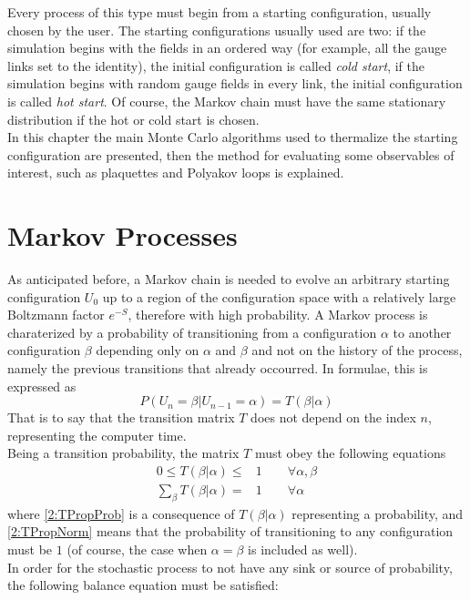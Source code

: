 Every process of this type must begin from a starting configuration, usually chosen by the user.
The starting configurations usually used are two: if the simulation begins with the fields in an ordered way (for example, all the gauge links set to the identity), the initial configuration is called \emph{cold start}, if the simulation begins with random gauge fields in every link, the initial configuration is called \emph{hot start}.
Of course, the Markov chain must have the same stationary distribution if the hot or cold start is chosen.\\
In this chapter the main Monte Carlo algorithms used to thermalize the starting configuration are presented, then the method for evaluating some observables of interest, such as plaquettes and Polyakov loops is explained.

\section{Markov Processes}
As anticipated before, a Markov chain is needed to evolve an arbitrary starting configuration $U_0$ up to a region of the configuration space with a relatively large Boltzmann factor $e^{-S}$, therefore with high probability.
A Markov process is charaterized by a probability of transitioning from a configuration $\alpha$ to another configuration $\beta$ depending only on $\alpha$ and $\beta$ and not on the history of the process, namely the previous transitions that already occourred.
In formulae, this is expressed as
\begin{equation}
    P(U_n=\beta|U_{n-1}=\alpha) = T(\beta|\alpha) \label{2:TransMatrix}
\end{equation}
That is to say that the transition matrix $T$ does not depend on the index $n$, representing the computer time.\\
Being a transition probability, the matrix $T$ must obey the following equations
\begin{align}
    0 \leq T(\beta|\alpha) \leq& 1 \qquad \forall \alpha,\beta \label{2:TPropProb} \\
    \sum_{\beta}T(\beta|\alpha) =& 1 \qquad \forall \alpha \label{2:TPropNorm}
\end{align}
where \eqref{2:TPropProb} is a consequence of $T(\beta|\alpha)$ representing a probability, and \eqref{2:TPropNorm} means that the probability of transitioning to any configuration must be $1$ (of course, the case when $\alpha=\beta$ is included as well).\\
In order for the stochastic process to not have any sink or source of probability, the following balance equation must be satisfied:
